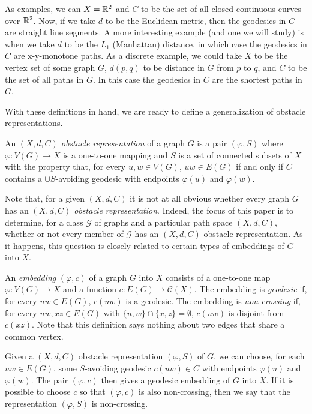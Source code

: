 \documentclass{patmorin}
\begin{document}
As examples, we can $X=\mathbb{R}^2$ and $C$ to be the set of all closed
continuous curves over $\mathbb{R}^2$.  Now, if we take $d$ to be the Euclidean
metric, then the geodesics in $C$ are straight line segments.  A more
interesting example (and one we will study) is when we take $d$ to be
the $L_1$ (Manhattan) distance, in which case the geodesics in $C$ are
x-y-monotone paths.  As a discrete example, we could take $X$ to be the
vertex set of some graph $G$, $d(p,q)$ to be distance in $G$ from $p$
to $q$, and $C$ to be the set of all paths in $G$. In this case the
geodesics in $C$ are the shortest paths in $G$.

With these definitions in hand, we are ready to define a generalization of
obstacle representations.  

\begin{defn}
An \emph{$(X,d,C)$ obstacle representation} of a graph $G$ is a pair
$(\varphi, S)$ where $\varphi:V(G)\to X$ is a one-to-one mapping and
$S$ is a set of connected subsets of $X$ with the property that, for
every $u,w\in V(G)$, $uw\in E(G)$ if and only if $C$ contains a $\cup
S$-avoiding geodesic with endpoints $\varphi(u)$ and $\varphi(w)$.
\end{defn}

Note that, for a given $(X,d,C)$ it is not at all obvious whether every
graph $G$ has an \emph{$(X,d,C)$ obstacle representation}.  Indeed,
the focus of this paper is to determine, for a class $\mathcal{G}$ of
graphs and a particular path space $(X,d,C)$, whether or not every
member of $\mathcal{G}$ has an $(X,d,C)$ obstacle representation.
As it happens, this question is closely related to certain types of
embeddings of $G$ into $X$.

An \emph{embedding} $(\varphi,c)$ of a graph $G$ into $X$ consists
of a one-to-one map $\varphi:V(G)\to X$ and a function $c: E(G)\to
\mathcal{C}(X)$.  The embedding is \emph{geodesic} if, for every $uw\in
E(G)$, $c(uw)$ is a geodesic.  The embedding is \emph{non-crossing} if,
for every $uw,xz\in E(G)$ with $\{u,w\}\cap \{x,z\}=\emptyset$, $c(uw)$
is disjoint from $c(xz)$.  Note that this definition says nothing about
two edges that share a common vertex.

Given a $(X,d,C)$ obstacle representation $(\varphi,S)$ of $G$, we can
choose, for each $uw\in E(G)$, some $S$-avoiding geodesic $c(uw)\in C$
with endpoints $\varphi(u)$ and $\varphi(w)$.  The pair $(\varphi,c)$
then gives a geodesic embedding of $G$ into $X$.  If it is possible to
choose $c$ so that $(\varphi,c)$ is also non-crossing, then we say that
the representation $(\varphi,S)$ is non-crossing.
\end{document}
